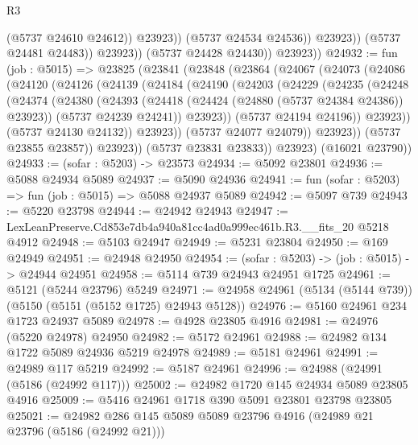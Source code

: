 \begin{lexlean}{R3}
\begin{coremodule}
                            (@5737 @24610 @24612))
                          @23923))
                      (@5737 @24534 @24536))
                    @23923))
                (@5737 @24481 @24483))
              @23923))
          (@5737 @24428 @24430))
        @23923))
@24932 := fun (job : @5015) =>
  @23825
    (@23841
      (@23848
        (@23864
          (@24067
            (@24073
              (@24086
                (@24120
                  (@24126
                    (@24139
                      (@24184
                        (@24190
                          (@24203
                            (@24229
                              (@24235
                                (@24248
                                  (@24374
                                    (@24380
                                      (@24393
                                        (@24418 (@24424 (@24880 (@5737 @24384 @24386)) @23923))
                                        (@5737 @24239 @24241))
                                      @23923))
                                  (@5737 @24194 @24196))
                                @23923))
                            (@5737 @24130 @24132))
                          @23923))
                      (@5737 @24077 @24079))
                    @23923))
                (@5737 @23855 @23857))
              @23923))
          (@5737 @23831 @23833))
        @23923)
      (@16021 @23790))
@24933 := (sofar : @5203) -> @23573
@24934 := @5092 @23801
@24936 := @5088 @24934 @5089
@24937 := @5090 @24936
@24941 := fun (sofar : @5203) => fun (job : @5015) => @5088 @24937 @5089
@24942 := @5097 @739
@24943 := @5220 @23798
@24944 := @24942 @24943
@24947 := LexLeanPreserve.Cd853e7db4a940a81cc4ad0a999ec461b.R3.__fits_20 @5218 @4912
@24948 := @5103 @24947
@24949 := @5231 @23804
@24950 := @169 @24949
@24951 := @24948 @24950
@24954 := (sofar : @5203) -> (job : @5015) -> @24944 @24951
@24958 := @5114 @739 @24943 @24951 @1725
@24961 := @5121 (@5244 @23796) @5249
@24971 := @24958 @24961 (@5134 (@5144 @739)) (@5150 (@5151 (@5152 @1725) @24943 @5128))
@24976 := @5160 @24961 @234 @1723 @24937 @5089
@24978 := @4928 @23805 @4916
@24981 := @24976 (@5220 @24978) @24950
@24982 := @5172 @24961
@24988 := @24982 @134 @1722 @5089 @24936 @5219 @24978
@24989 := @5181 @24961
@24991 := @24989 @117 @5219
@24992 := @5187 @24961
@24996 := @24988 (@24991 (@5186 (@24992 @117)))
@25002 := @24982 @1720 @145 @24934 @5089 @23805 @4916
@25009 := @5416 @24961 @1718 @390 @5091 @23801 @23798 @23805
@25021 := @24982 @286 @145 @5089 @5089 @23796 @4916 (@24989 @21 @23796 (@5186 (@24992 @21)))

\end{coremodule}
\end{lexlean}
